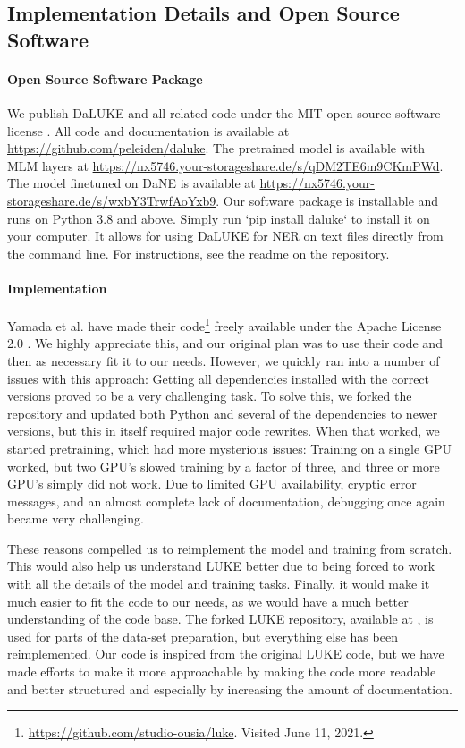 \documentclass[main.tex]{subfiles}
\begin{document}
\subsection{Implementation Details and Open Source Software}%
\label{sub:oss}

\paragraph{Open Source Software Package}
We publish DaLUKE and all related code under the MIT open source software license \cite{mitlicense}.
All code and documentation is available at \url{https://github.com/peleiden/daluke}.
The pretrained model is available with MLM layers at \url{https://nx5746.your-storageshare.de/s/qDM2TE6m9CKmPWd}.
The model finetuned on DaNE is available at \url{https://nx5746.your-storageshare.de/s/wxbY3TrwfAoYxb9}.
Our software package is  installable and runs on Python 3.8 and above.
Simply run `pip install daluke` to install it on your computer.
It allows for using DaLUKE for NER on text files directly from the command line.
For instructions, see the readme on the repository.

\paragraph{Implementation}
Yamada et al. have made their code\footnote{\url{https://github.com/studio-ousia/luke}. Visited June 11, 2021.} freely available under the Apache License 2.0 \cite{apachelicense}.
We highly appreciate this, and our original plan was to use their code and then as necessary fit it to our needs.
However, we quickly ran into a number of issues with this approach:
Getting all dependencies installed with the correct versions proved to be a very challenging task.
To solve this, we forked the repository and updated both Python and several of the dependencies to newer versions, but this in itself required major code rewrites.
When that worked, we started pretraining, which had more mysterious issues:
Training on a single GPU worked, but two GPU's slowed training by a factor of three, and three or more GPU's simply did not work.
Due to limited GPU availability, cryptic error messages, and an almost complete lack of documentation, debugging once again became very challenging.

These reasons compelled us to reimplement the model and training from scratch.
This would also help us understand LUKE better due to being forced to work with all the details of the model and training tasks.
Finally, it would make it much easier to fit the code to our needs, as we would have a much better understanding of the code base.
The forked LUKE repository, available at , is used for parts of the data-set preparation, but everything else has been reimplemented.
Our code is inspired from the original LUKE code, but we have made efforts to make it more approachable by making the code more readable and better structured and especially by increasing the amount of documentation.
\end{document}
